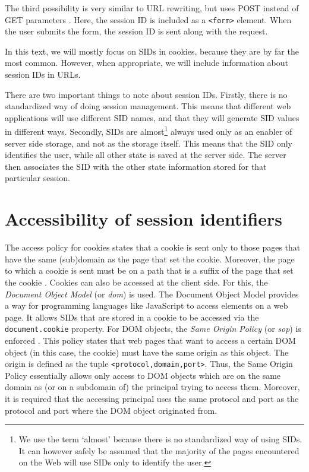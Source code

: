 The third possibility is very similar to URL rewriting, but uses POST instead of GET parameters \cite{Johns2006}. Here, the session ID is included as a \texttt{<form>} element. When the user submits the form, the session ID is sent along with the request.

In this text, we will mostly focus on SIDs in cookies, because they are by far the most common. However, when appropriate, we will include information about session IDs in URLs.

There are two important things to note about session IDs. Firstly, there is no standardized way of doing session management. This means that different web applications will use different SID names, and that they will generate SID values in different ways. Secondly, SIDs are almost\footnote{We use the term `almost' because there is no standardized way of using SIDs. It can however safely be assumed that the majority of the pages encountered on the Web will use SIDs only to identify the user.} always used only as an enabler of server side storage, and not as the storage itself. This means that the SID only identifies the user, while all other state is saved at the server side. The server then associates the SID with the other state information stored for that particular session.

\section{Accessibility of session identifiers}

\label{access-control}\label{sop}The access policy for cookies states that a cookie is sent only to those pages that have the same (sub)domain as the page that set the cookie. Moreover, the page to which a cookie is sent must be on a path that is a suffix of the page that set the cookie \cite{Singh2010}. Cookies can also be accessed at the client side. For this, the \emph{Document Object Model} (or \emph{\gls{dom}}) is used. The Document Object Model provides a way for programming languages like JavaScript to access elements on a web page. It allows SIDs that are stored in a cookie to be accessed via the \texttt{document.cookie} property. For DOM objects, the \emph{Same Origin Policy} (or \emph{\gls{sop}}) is enforced \cite{Singh2010}. This policy states that web pages that want to access a certain DOM object (in this case, the cookie) must have the same origin as this object. The origin is defined as the tuple \texttt{<protocol,domain,port>}. Thus, the Same Origin Policy essentially allows only access to DOM objects which are on the same domain as (or on a subdomain of) the principal trying to access them. Moreover, it is required that the accessing principal uses the same protocol and port as the protocol and port where the DOM object originated from.

